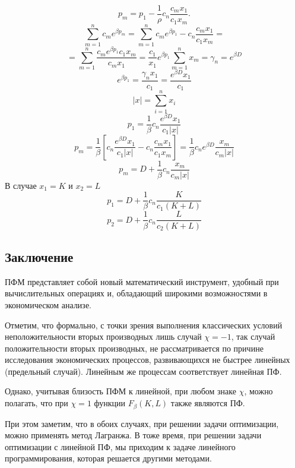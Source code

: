 \documentclass[12pt,openbib]{report}
\begin{document}
\begin{equation}\label{f267}
p_m=p_1-\frac{1}{\rho}c_n\frac{c_m x_1}{c_1x_m}.
\end{equation}
$$\sum_{m=1}^{n}c_me^{\beta p_m}=\sum_{m=1}^{n}c_me^{\beta p_1}-c_n\frac{c_m x_1}{c_1x_m}=$$
$$=\sum_{m=1}^{n}\frac{c_me^{\beta p_1} c_1 x_m}{c_m x_1}=\frac{c_1}{x_1}e^{\beta p_1}\sum_{m=1}^{n}x_m=\gamma_n=e^{\beta D}$$
$$e^{\beta p_1}=\frac{\gamma_n x_1}{c_1}=\frac{e^{\beta D} x_1}{c_1}$$
$$|x|=\sum_{i=1}^nx_i$$
$$p_1=\frac{1}{\beta}c_n\frac{e^{\beta D} x_1}{c_1|x|}$$
$$p_m=\frac{1}{\beta}\left[c_n\frac{e^{\beta D} x_1}{c_1|x|}-c_n\frac{c_m x_1}{c_1x_m}\right]=\frac{1}{\beta}c_ne^{\beta D} \frac{x_m}{c_m|x|}$$
$$p_m=D+\frac{1}{\beta}c_n \frac{x_m}{c_m|x|}$$
В случае $x_1=K$ и $x_2=L$
$$p_1=D+\frac{1}{\beta}c_n \frac{K}{c_1(K+L)}$$
$$p_2=D+\frac{1}{\beta}c_n \frac{L}{c_2(K+L)}$$

\newpage

\begin{center}
\section*{Заключение}
\end{center}

ПФМ представляет собой новый математический инструмент, удобный при вычислительных операциях и, обладающий широкими возможностями в экономическом анализе.

Отметим, что формально, с точки зрения выполнения классических условий неположительности вторых производных лишь случай $\chi=-1$,
так случай положительности вторых производных, не рассматривается по причине исследования экономических процессов,
развивающихся не быстрее линейных (предельный случай). Линейным же процессам соответствует линейная ПФ.

Однако, учитывая близость ПФМ к линейной, при любом знаке $\chi$, можно полагать, что при $\chi=1$ функции $F_\beta(K,L)$ также являются ПФ.

При этом заметим, что в обоих случаях, при решении задачи оптимизации, можно применять метод Лагранжа.
В тоже время, при решении задачи оптимизации с линейной ПФ, мы приходим к задаче линейного программирования, которая решается другими методами.

\newpage
\end{document}
